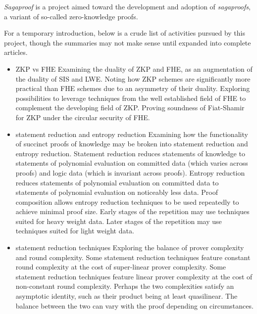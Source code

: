 
\emph{Sagaproof} is a project aimed toward the development and adoption of \emph{sagaproofs}, a variant of so-called zero-knowledge proofs.

For a temporary introduction, below is a crude list of activities pursued by this project, though the summaries may not make sense until expanded into complete articles.

\begin{itemize}

    \item{ZKP vs FHE}
    Examining the duality of ZKP and FHE, as an augmentation of the duality of SIS and LWE.
    Noting how ZKP schemes are significantly more practical than FHE schemes due to an asymmetry of their duality.
    Exploring possibilities to leverage techniques from the well established field of FHE to complement the developing field of ZKP.
    Proving soundness of Fiat-Shamir for ZKP under the circular security of FHE.

    \item{statement reduction and entropy reduction}
    Examining how the functionality of succinct proofs of knowledge may be broken into statement reduction and entropy reduction.
    Statement reduction reduces statements of knowledge to statements of polynomial evaluation on committed data (which varies across proofs) and logic data (which is invariant across proofs).
    Entropy reduction reduces statements of polynomial evaluation on committed data to statements of polynomial evaluation on noticeably less data.
    Proof composition allows entropy reduction techniques to be used repeatedly to achieve minimal proof size.
    Early stages of the repetition may use techniques suited for heavy weight data.
    Later stages of the repetition may use techniques suited for light weight data.

    \item{statement reduction techniques}
    Exploring the balance of prover complexity and round complexity.
    Some statement reduction techniques feature constant round complexity at the cost of super-linear prover complexity.
    Some statement reduction techniques feature linear prover complexity at the cost of non-constant round complexity.
    Perhaps the two complexities satisfy an asymptotic identity, such as their product being at least quasilinear.
    The balance between the two can vary with the proof depending on circumstances.


\end{itemize}
